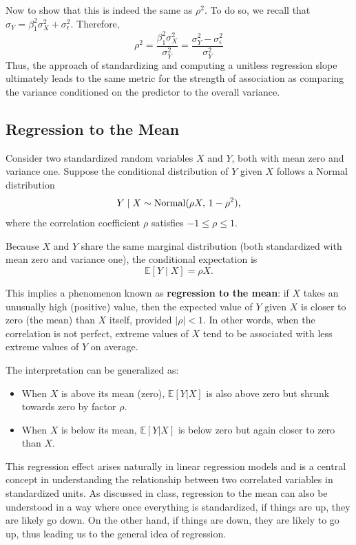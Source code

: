 Now to show that this is indeed the same as $\rho^2$. To do so, we recall that $\sigma_Y = \beta_1^2\sigma_X^2 + \sigma_{\epsilon}^2$. Therefore, 
\begin{equation}
\rho^2 = \frac{\beta_1^2 \sigma_X^2}{\sigma_Y^2} =  \frac{\sigma_Y^2 -\sigma_{\epsilon}^2 }{\sigma_Y^2}
\end{equation}
Thus, the approach of standardizing and computing a unitless regression slope ultimately leads to the same metric for the strength of association as comparing the variance conditioned on the predictor to the overall variance. 


\subsection{Regression to the Mean}

Consider two standardized random variables $X$ and $Y$, both with mean zero and variance one. Suppose the conditional distribution of $Y$ given $X$ follows a Normal distribution
\[
Y \mid X \sim {\rm Normal}(\rho X, \, 1 - \rho^2),
\]
where the correlation coefficient $\rho$ satisfies $-1 \leq \rho \leq 1$.

Because $X$ and $Y$ share the same marginal distribution (both standardized with mean zero and variance one), the conditional expectation is
\[
\mathbb{E}[Y \mid X] = \rho X.
\]

This implies a phenomenon known as \textbf{regression to the mean}: if $X$ takes an unusually high (positive) value, then the expected value of $Y$ given $X$ is closer to zero (the mean) than $X$ itself, provided $|\rho| < 1$. In other words, when the correlation is not perfect, extreme values of $X$ tend to be associated with less extreme values of $Y$ on average.

The interpretation can be generalized as:
\begin{itemize}
    \item When $X$ is above its mean (zero), $\mathbb{E}[Y|X]$ is also above zero but shrunk towards zero by factor $\rho$.
    \item When $X$ is below its mean, $\mathbb{E}[Y|X]$ is below zero but again closer to zero than $X$.
\end{itemize}

This regression effect arises naturally in linear regression models and is a central concept in understanding the relationship between two correlated variables in standardized units. As discussed in class, regression to the mean can also be understood in a way where once everything is standardized, if things are up, they are likely go down. On the other hand, if things are down, they are likely to go up, thus leading us to the general idea of regression.


